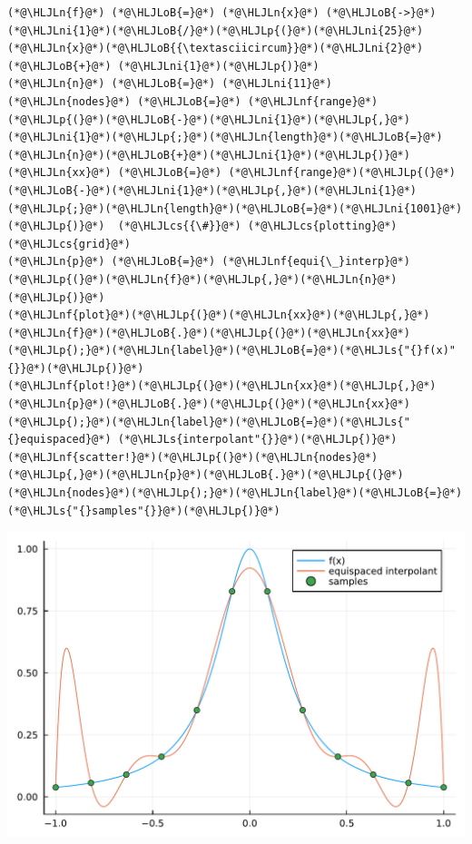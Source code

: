 \documentclass[12pt,a4paper]{article}
\newcommand{\HLJLn}[1]{#1}
\newcommand{\HLJLnf}[1]{\textcolor[RGB]{66,102,213}{#1}}
\newcommand{\HLJLs}[1]{\textcolor[RGB]{201,61,57}{#1}}
\newcommand{\HLJLni}[1]{\textcolor[RGB]{59,151,46}{#1}}
\newcommand{\HLJLoB}[1]{\textcolor[RGB]{102,102,102}{\textbf{#1}}}
\newcommand{\HLJLp}[1]{#1}
\newcommand{\HLJLcs}[1]{\textcolor[RGB]{153,153,119}{\textit{#1}}}
\begin{document}
\begin{lstlisting}
(*@\HLJLn{f}@*) (*@\HLJLoB{=}@*) (*@\HLJLn{x}@*) (*@\HLJLoB{->}@*) (*@\HLJLni{1}@*)(*@\HLJLoB{/}@*)(*@\HLJLp{(}@*)(*@\HLJLni{25}@*)(*@\HLJLn{x}@*)(*@\HLJLoB{{\textasciicircum}}@*)(*@\HLJLni{2}@*) (*@\HLJLoB{+}@*) (*@\HLJLni{1}@*)(*@\HLJLp{)}@*)
(*@\HLJLn{n}@*) (*@\HLJLoB{=}@*) (*@\HLJLni{11}@*)
(*@\HLJLn{nodes}@*) (*@\HLJLoB{=}@*) (*@\HLJLnf{range}@*)(*@\HLJLp{(}@*)(*@\HLJLoB{-}@*)(*@\HLJLni{1}@*)(*@\HLJLp{,}@*)(*@\HLJLni{1}@*)(*@\HLJLp{;}@*)(*@\HLJLn{length}@*)(*@\HLJLoB{=}@*)(*@\HLJLn{n}@*)(*@\HLJLoB{+}@*)(*@\HLJLni{1}@*)(*@\HLJLp{)}@*)  
(*@\HLJLn{xx}@*) (*@\HLJLoB{=}@*) (*@\HLJLnf{range}@*)(*@\HLJLp{(}@*)(*@\HLJLoB{-}@*)(*@\HLJLni{1}@*)(*@\HLJLp{,}@*)(*@\HLJLni{1}@*)(*@\HLJLp{;}@*)(*@\HLJLn{length}@*)(*@\HLJLoB{=}@*)(*@\HLJLni{1001}@*)(*@\HLJLp{)}@*)  (*@\HLJLcs{{\#}}@*) (*@\HLJLcs{plotting}@*) (*@\HLJLcs{grid}@*)
(*@\HLJLn{p}@*) (*@\HLJLoB{=}@*) (*@\HLJLnf{equi{\_}interp}@*)(*@\HLJLp{(}@*)(*@\HLJLn{f}@*)(*@\HLJLp{,}@*)(*@\HLJLn{n}@*)(*@\HLJLp{)}@*) 
(*@\HLJLnf{plot}@*)(*@\HLJLp{(}@*)(*@\HLJLn{xx}@*)(*@\HLJLp{,}@*)(*@\HLJLn{f}@*)(*@\HLJLoB{.}@*)(*@\HLJLp{(}@*)(*@\HLJLn{xx}@*)(*@\HLJLp{);}@*)(*@\HLJLn{label}@*)(*@\HLJLoB{=}@*)(*@\HLJLs{"{}f(x)"{}}@*)(*@\HLJLp{)}@*)
(*@\HLJLnf{plot!}@*)(*@\HLJLp{(}@*)(*@\HLJLn{xx}@*)(*@\HLJLp{,}@*)(*@\HLJLn{p}@*)(*@\HLJLoB{.}@*)(*@\HLJLp{(}@*)(*@\HLJLn{xx}@*)(*@\HLJLp{);}@*)(*@\HLJLn{label}@*)(*@\HLJLoB{=}@*)(*@\HLJLs{"{}equispaced}@*) (*@\HLJLs{interpolant"{}}@*)(*@\HLJLp{)}@*)
(*@\HLJLnf{scatter!}@*)(*@\HLJLp{(}@*)(*@\HLJLn{nodes}@*)(*@\HLJLp{,}@*)(*@\HLJLn{p}@*)(*@\HLJLoB{.}@*)(*@\HLJLp{(}@*)(*@\HLJLn{nodes}@*)(*@\HLJLp{);}@*)(*@\HLJLn{label}@*)(*@\HLJLoB{=}@*)(*@\HLJLs{"{}samples"{}}@*)(*@\HLJLp{)}@*)
\end{lstlisting}

\includegraphics[width=\linewidth]{jl_hpkPoK/OP_methods_test_3_1.pdf}
\end{document}
